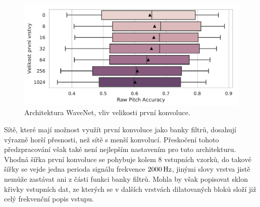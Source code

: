 \begin{figure}[h]\centering
    \includegraphics[scale=0.6]{../img/figures/wavenet_first_layer}
\caption{Architektura WaveNet, vliv velikosti první konvoluce.}\label{obr:wavenet_first_layer}
\end{figure}

Sítě, které mají možnost využít první konvoluce jako banky filtrů, dosahují výrazně horší přesnosti, než sítě s menší konvolucí. Přeskočení tohoto předzpracování však také není nejlepším nastavením pro tuto architekturu. Vhodná šířka první konvoluce se pohybuje kolem 8 vstupních vzorků, do takové šířky se vejde jedna perioda signálu frekvence $2000\,\rm Hz$, jinými slovy vrstva jistě nemůže zastávat ani z části funkci banky filtrů. Mohla by však popisovat sklon křivky vstupních dat, ze kterých se v dalších vrstvách dilatovaných bloků složí již celý frekvenční popis vstupu.





